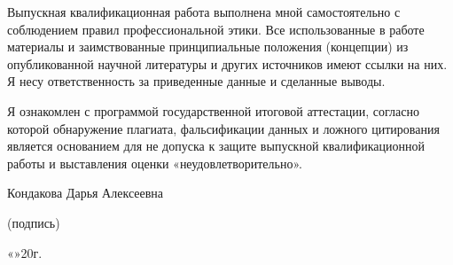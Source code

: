 Выпускная квалификационная работа выполнена мной самостоятельно с соблюдением правил профессиональной этики. Все использованные в работе материалы и заимствованные принципиальные положения (концепции) из опубликованной научной литературы и других источников имеют ссылки на них. Я несу ответственность за приведенные данные и сделанные выводы.

Я ознакомлен с программой государственной итоговой аттестации, согласно которой обнаружение плагиата, фальсификации данных и ложного цитирования является основанием для не допуска к защите выпускной квалификационной работы и выставления оценки «неудовлетворительно».

\vspace{3em}
\noindent
Кондакова Дарья Алексеевна \hspace*{\fill} \makebox[5cm]{\hrulefill}\\
\vspace{-3em}
\begin{flushright}
			\footnotesize (подпись)~~~~~~~~~~~~~~~
\end{flushright}

\noindent
«\makebox[0.7cm]{\hrulefill}»\makebox[3cm]{\hrulefill}20\makebox[0.7cm]{\hrulefill}г. 
